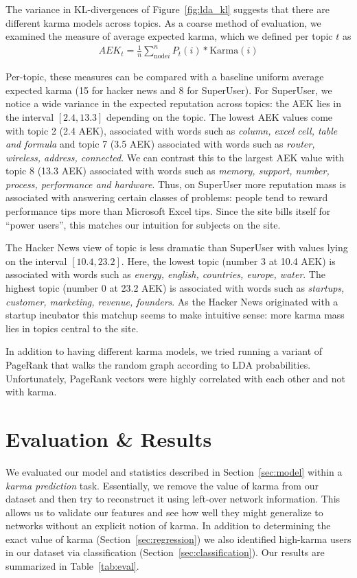 \documentclass[11pt]{article}
\begin{document}
The variance in KL-divergences of Figure~\ref{fig:lda_kl} suggests that there
are different karma models across topics. As a coarse method of evaluation, we
examined the measure of average expected karma, which we defined per topic $t$
as
\begin{align*}
AEK_t = \frac{1}{n} \sum_{\text{node} i}^n P_t(i) * \text{Karma}(i)
\end{align*}

Per-topic, these measures can be compared with a baseline uniform average
expected karma (15 for hacker news and 8 for SuperUser). For SuperUser, we
notice a wide variance in the expected reputation across topics: the AEK lies in
the interval $[2.4, 13.3]$ depending on the topic. The lowest AEK values come
with topic 2 (2.4 AEK), associated with words such as \textit{column, excel
cell, table and formula} and topic 7 (3.5 AEK) associated with words such as
\textit{router, wireless, address, connected}. We can contrast this to the
largest AEK value with topic 8 (13.3 AEK) associated with words such as
\textit{memory, support, number, process, performance and hardware}. Thus, on
SuperUser more reputation mass is associated with answering certain classes of
problems: people tend to reward performance tips more than Microsoft Excel tips.
Since the site bills itself for ``power users'', this matches our intuition for
subjects on the site.

The Hacker News view of topic is less dramatic than SuperUser with values lying
on the interval $[10.4, 23.2]$. Here, the lowest topic (number 3 at 10.4 AEK) is
associated with words such as \textit{energy, english, countries, europe,
water}. The highest topic (number 0 at 23.2 AEK) is associated with words such
as \textit{startups, customer, marketing, revenue, founders}. As the Hacker News
originated with a startup incubator this matchup seems to make intuitive sense:
more karma mass lies in topics central to the site.

In addition to having different karma models, we tried running a variant of
PageRank that walks the random graph according to LDA probabilities.
Unfortunately, PageRank vectors were highly correlated with each other and not
with karma.

\section{Evaluation \& Results}
\label{sec:eval}

We evaluated our model and statistics described in Section~\ref{sec:model}
within a \textit{karma prediction} task. Essentially, we remove the value of
karma from our dataset and then try to reconstruct it using left-over network
information. This allows us to validate our features and see how well they might
generalize to networks without an explicit notion of karma. In addition to
determining the exact value of karma (Section~\ref{sec:regression}) we also
identified high-karma users in our dataset via classification
(Section~\ref{sec:classification}). Our results are summarized in
Table~\ref{tab:eval}.
\end{document}
